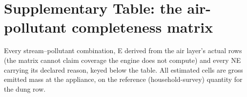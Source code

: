 \section{Supplementary Table: the air-pollutant completeness matrix}
\label{app:airmatrix}

Every stream--pollutant combination, E derived from the air layer's actual
rows (the matrix cannot claim coverage the engine does not compute) and every
NE carrying its declared reason, keyed below the table. All estimated cells
are gross emitted mass at the appliance, on the reference (household-survey) quantity for the dung row.

